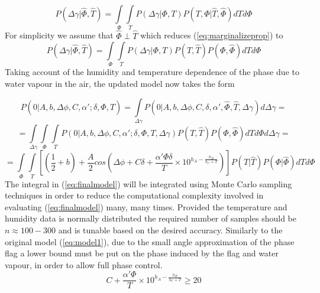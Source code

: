 \begin{equation}
P(\Delta\gamma|\hat{\Phi},\hat{T})= \int \limits_\Phi \int \limits_T P(\Delta\gamma|\Phi,T)P(T,\Phi|\hat{T},\hat{\Phi})dTd\Phi
\label{eq:marginalizeprop}
\end{equation}  
For simplicity we assume that $\hat{\Phi}\perp\hat{T}$ which reduces 
(\ref{eq:marginalizeprop}) to 
\begin{equation}
P(\Delta\gamma|\hat{\Phi},\hat{T})= \int \limits_\Phi \int \limits_T P(\Delta\gamma|\Phi,T)P(T,\hat{T})P(\Phi,\hat{\Phi})dTd\Phi
\label{eq:marginalizeprop2}
\end{equation}
Taking account of the humidity and temperature dependence of the phase due to water vapour in the air, the updated model now takes the form 

\begin{equation*}
  P(0|A,b,\Delta\phi,C,\alpha';\delta,\hat{\Phi},\hat{T}) = \int \limits_{\Delta\gamma} P(0|A,b,\Delta\phi,C,\delta,\alpha',\hat{\Phi},\hat{T},\Delta\gamma)d\Delta\gamma =
\end{equation*}
\begin{equation*}
= \int \limits_{\Delta\gamma} \int \limits_\Phi \int \limits_T P(0|A,b,\Delta\phi,C,\alpha';\delta,\Phi,T,\Delta\gamma)P(T,\hat{T})P(\Phi,\hat{\Phi})dTd\Phi d\Delta\gamma =
\end{equation*}
\small
\begin{equation}
= \int \limits_\Phi \int \limits_T \left[(\frac{1}{2}+b)+\frac{A}{2}cos\left(\Delta\phi + C\delta + \frac{\alpha' \Phi\delta}{T}\times 10^{h_A - \frac{h_B}{h_C + T}}\right)\right]P(T|\hat{T})P(\Phi|\hat{\Phi})dTd\Phi
\label{eq:finalmodel}
\end{equation}
\normalsize
The integral in (\ref{eq:finalmodel}) will be integrated using Monte Carlo sampling techniques in order to reduce the computational complexity involved in evaluating (\ref{eq:finalmodel}) many, many times. Provided the temperature and humidity data is normally distributed the required number of samples should be $n\approx100-300$ and is tunable based on the desired accuracy. Similarly to the original model (\ref{eq:model1}), due to the small angle approximation of the phase flag a lower bound must be put on the phase induced by the flag and water vapour, in order to allow full phase control. 
\begin{equation}
C+\frac{\alpha'\Phi}{T}\times 10^{h_A - \frac{h_B}{h_C + T}} \geq 20
\label{eq:fullphasecontrol}
\end{equation}

